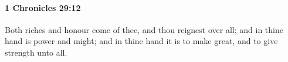 
		\paragraph{1 Chronicles 29:12} %
			\label{1CHRONICLES-29-12}

			Both riches and honour come of thee, and thou reignest over all; and in thine hand is power and might; and in thine hand it is to make great, and to give strength unto all.


